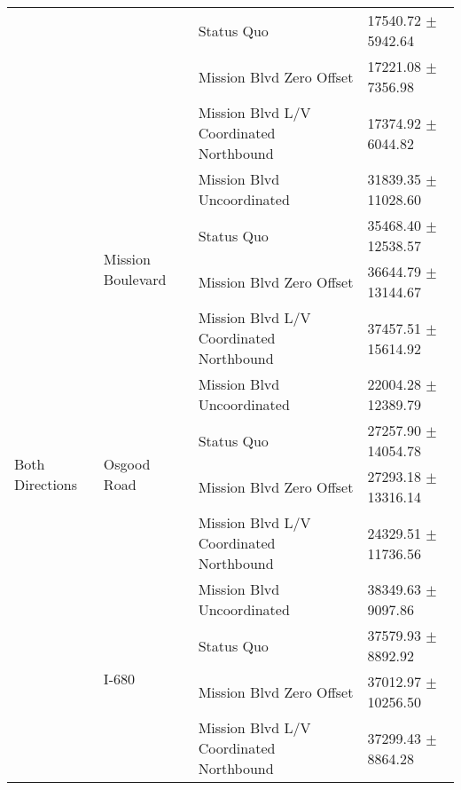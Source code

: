 \begin{table}
\begin{tabular}{llll}
 &  & Status Quo & 17540.72 $\pm$ 5942.64 \\
 &  & Mission Blvd Zero Offset & 17221.08 $\pm$ 7356.98 \\
 &  & Mission Blvd L/V Coordinated Northbound & 17374.92 $\pm$ 6044.82 \\
\multirow[t]{12}{*}{Both Directions} & \multirow[t]{4}{*}{Mission Boulevard} & Mission Blvd Uncoordinated & 31839.35 $\pm$ 11028.60 \\
 &  & Status Quo & 35468.40 $\pm$ 12538.57 \\
 &  & Mission Blvd Zero Offset & 36644.79 $\pm$ 13144.67 \\
 &  & Mission Blvd L/V Coordinated Northbound & 37457.51 $\pm$ 15614.92 \\
 & \multirow[t]{4}{*}{Osgood Road} & Mission Blvd Uncoordinated & 22004.28 $\pm$ 12389.79 \\
 &  & Status Quo & 27257.90 $\pm$ 14054.78 \\
 &  & Mission Blvd Zero Offset & 27293.18 $\pm$ 13316.14 \\
 &  & Mission Blvd L/V Coordinated Northbound & 24329.51 $\pm$ 11736.56 \\
 & \multirow[t]{4}{*}{I-680} & Mission Blvd Uncoordinated & 38349.63 $\pm$ 9097.86 \\
 &  & Status Quo & 37579.93 $\pm$ 8892.92 \\
 &  & Mission Blvd Zero Offset & 37012.97 $\pm$ 10256.50 \\
 &  & Mission Blvd L/V Coordinated Northbound & 37299.43 $\pm$ 8864.28 \\
\bottomrule
\end{tabular}
\end{table}
